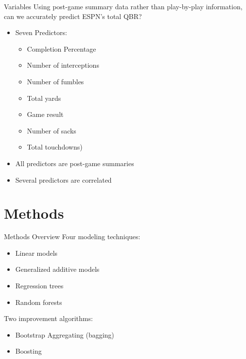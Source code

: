 \documentclass{beamer}
\begin{document}
	\begin{frame}{Variables}
				Using post-game summary data rather than play-by-play information, can we accurately predict ESPN's total QBR?
		\begin{itemize}
			\item Seven Predictors:
			\begin{itemize}
				\item Completion Percentage
				\item Number of interceptions
				\item Number of fumbles
				\item Total yards
				\item Game result
				\item Number of sacks
				\item Total touchdowns)
			\end{itemize}
			\item All predictors are post-game summaries
			\item Several predictors are correlated
		\end{itemize}
	\end{frame}

	
	\section{Methods}
	
	\begin{frame}{Methods Overview}
		Four modeling techniques:
		\begin{itemize}
			\item Linear models
			\item Generalized additive models
			\item Regression trees
			\item Random forests
		\end{itemize}
		Two improvement algorithms:
		\begin{itemize}
			\item Bootstrap Aggregating (bagging)
			\item Boosting
		\end{itemize}
	\end{frame}
\end{document}
